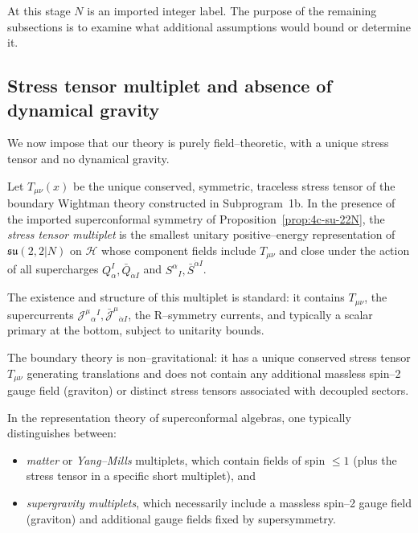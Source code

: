 At this stage \(N\) is an imported integer label. The purpose of the
remaining subsections is to examine what additional assumptions would
bound or determine it.

\subsection{Stress tensor multiplet and absence of dynamical gravity}
\label{subsec:4c-stresstensor}

We now impose that our theory is purely field–theoretic, with a unique
stress tensor and no dynamical gravity.

\begin{definition}
\label{def:4c-T-multiplet}
Let \(T_{\mu\nu}(x)\) be the unique conserved, symmetric, traceless
stress tensor of the boundary Wightman theory constructed in
Subprogram~1b. In the presence of the imported superconformal symmetry
of Proposition~\ref{prop:4c-su-22N}, the \emph{stress tensor multiplet} is the
smallest unitary positive–energy representation of
\(\mathfrak{su}(2,2|N)\) on \(\mathcal H\) whose component fields
include \(T_{\mu\nu}\) and close under the action of all supercharges
\(Q_\alpha^I,\bar Q_{\dot\alpha I}\) and \(S^\alpha{}_I,\bar S^{\dot\alpha I}\).
\end{definition}

The existence and structure of this multiplet is standard: it contains
\(T_{\mu\nu}\), the supercurrents
\(\mathcal J^\mu{}_\alpha{}^I,\bar{\mathcal J}^\mu{}_{\dot\alpha I}\),
the R–symmetry
currents, and typically a scalar primary at the bottom, subject to
unitarity bounds.

\begin{assumption}
\label{ass:4c-NG}
The boundary theory is non–gravitational: it has a unique conserved
stress tensor \(T_{\mu\nu}\) generating translations and does not
contain any additional massless spin–2 gauge field (graviton) or
distinct stress tensors associated with decoupled sectors.
\end{assumption}

In the representation theory of superconformal algebras, one typically
distinguishes between:

\begin{itemize}
  \item \emph{matter} or \emph{Yang–Mills} multiplets, which contain
        fields of spin \(\le1\) (plus the stress tensor in a specific
        short multiplet), and
  \item \emph{supergravity multiplets}, which necessarily include a
        massless spin–2 gauge field (graviton) and additional gauge
        fields fixed by supersymmetry.
\end{itemize}

